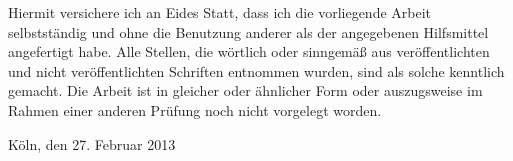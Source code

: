 Hiermit versichere ich an Eides Statt, dass ich die vorliegende Arbeit selbstständig und ohne die Benutzung anderer als der angegebenen Hilfsmittel angefertigt habe. 
Alle Stellen, die wörtlich oder sinngemäß aus veröffentlichten und nicht veröffentlichten Schriften entnommen wurden, sind als solche kenntlich gemacht. 
Die Arbeit ist in gleicher oder ähnlicher Form oder auszugsweise im Rahmen einer anderen Prüfung noch nicht vorgelegt worden.

\vspace{30mm}
\begin{flushleft}
    Köln, den 27. Februar 2013
\end{flushleft}